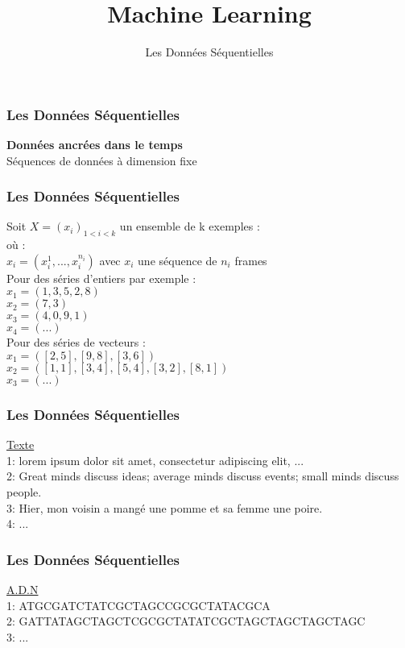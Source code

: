 \documentclass{formation}
\title{Machine Learning}
\subtitle{Les Données Séquentielles}
\begin{document}
\maketitle

\begin{frame}
  \frametitle{Les Données Séquentielles}
  \begin{center}
    \textbf{Données ancrées dans le temps} \\
    $\;$ \\
    Séquences de données à dimension fixe
  \end{center}
\end{frame}

\begin{frame}
  \frametitle{Les Données Séquentielles}
  Soit $X=(x_i)_{1<i<k}$ un ensemble de k exemples : \\
  où : \\
  $x_i = (x_{i}^1 , ... , x_{i}^{n_i})$ avec $x_i$ une séquence de $n_i$ frames \\
  \newline
  Pour des séries d'entiers par exemple : \\
  $x_1 = (1,3,5,2,8)$ \\
  $x_2 = (7,3)$ \\
  $x_3 = (4,0,9,1)$ \\
  $x_4 = (...)$ \\
  \newline
  Pour des séries de vecteurs : \\
  $x_1 = ([2,5],[9,8],[3,6])$ \\
  $x_2 = ([1,1],[3,4],[5,4],[3,2],[8,1])$ \\
  $x_3 = (...)$ 
\end{frame}

\begin{frame}
  \frametitle{Les Données Séquentielles}
  \underline{Texte} \\
  1: lorem ipsum dolor sit amet, consectetur adipiscing elit, ... \\
  2: Great minds discuss ideas; average minds discuss events; small minds discuss people. \\
  3: Hier, mon voisin a mangé une pomme et sa femme une poire. \\
  4: ...
\end{frame}

\begin{frame}
  \frametitle{Les Données Séquentielles}
  \underline{A.D.N} \\
  1: ATGCGATCTATCGCTAGCCGCGCTATACGCA \\
  2: GATTATAGCTAGCTCGCGCTATATCGCTAGCTAGCTAGCTAGC \\
  3: ...
\end{frame}
\end{document}
